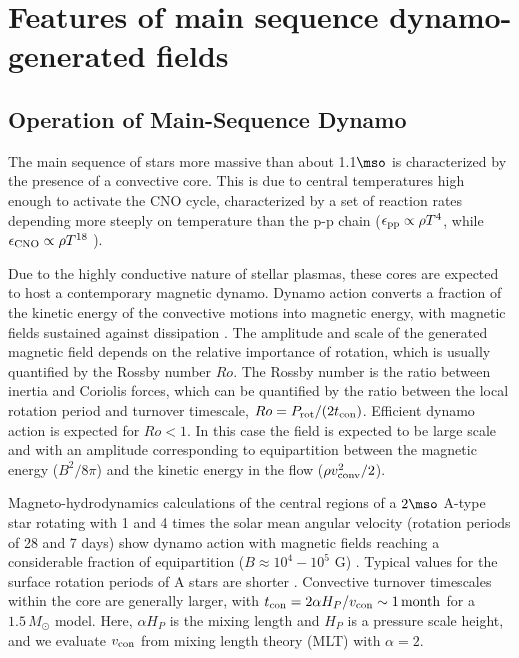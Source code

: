\section{Features of main sequence dynamo-generated fields}

\subsection{Operation of Main-Sequence Dynamo}

The main sequence of stars more massive than about 1.1$\mso$ is characterized by the presence of a convective core.
This is due to central temperatures high enough to activate the CNO cycle, characterized by a set of reaction rates depending more steeply on temperature than the p-p chain ($\epsilon_{\rm pp}\propto \rho T^{4}$, while $\epsilon_{\rm CNO}\propto \rho T^{18}$ ).

Due to the highly conductive nature of stellar plasmas, 
these cores are expected to host a contemporary magnetic dynamo. Dynamo action converts a fraction of the kinetic energy 
of the convective motions into magnetic energy, with magnetic fields sustained against dissipation  \citep[see e.g.,][]{Brandenburg_2005}. The amplitude and scale of the generated magnetic field depends on the relative importance of rotation, which is usually quantified by the Rossby number $Ro$. The Rossby number is the ratio between inertia and Coriolis forces, which can be quantified by the ratio between the local rotation period and turnover timescale, $Ro = P_{\rm rot}/(2 t_{\rm con})$. 
Efficient dynamo action is expected for $Ro<1$. In this case the field is expected to be large scale and with an amplitude corresponding to equipartition between the magnetic energy ($B^2/8\pi$) and the kinetic energy in the flow ($\rho v^2_{\rm conv}/2$). 


Magneto-hydrodynamics calculations of the central regions of a $2\mso$ A-type star rotating with 
1 and 4 times the solar mean angular velocity (rotation periods of 28 and 7 days) show dynamo action 
with magnetic fields reaching a considerable fraction of equipartition ($B \approx 10^4-10^5$ G) \citep{Brun_2005}. Typical values for the surface  rotation periods of A stars are shorter \citep[about 1 day, see e.g.]{Zorec_2012}. Convective turnover timescales within the core are generally larger, with $t_{\rm con} = 2 \alpha H_P/v_{\rm con} \sim 1 \, {\rm month}$ for a $1.5 \, M_\odot$ model. Here, $\alpha H_P$ is the mixing length and $H_P$ is a pressure scale height, and we evaluate $v_{\rm con}$ from mixing length theory (MLT) with $\alpha = 2$. 

